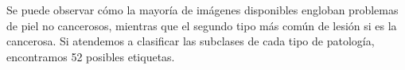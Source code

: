 Se puede observar cómo la mayoría de imágenes disponibles engloban problemas de piel no cancerosos, mientras que el segundo tipo más común de lesión si es la cancerosa. Si atendemos a clasificar las subclases de cada tipo de patología, encontramos 52 posibles etiquetas.



